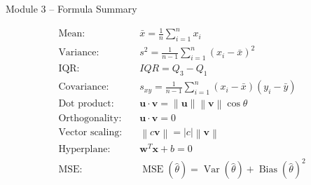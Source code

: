 \documentclass[aspectratio=169,11pt]{beamer}
\newcommand{\Var}{\operatorname{Var}}
\newcommand{\Bias}{\operatorname{Bias}}
\newcommand{\MSE}{\operatorname{MSE}}
\newcommand{\norm}[1]{\left\lVert #1\right\rVert}
\begin{document}

\begin{frame}{Module 3 -- Formula Summary}

\small

\begin{align*}
\text{Mean:}\quad&
\bar{x}=\frac1n\sum_{i=1}^{n}x_i
\\[4pt]
\text{Variance:}\quad&
s^2=\frac1{n-1}\sum_{i=1}^{n}(x_i-\bar{x})^2
\\[4pt]
\text{IQR:}\quad&
IQR=Q_3-Q_1
\\[4pt]
\text{Covariance:}\quad&
s_{xy}=
\frac1{n-1}\sum_{i=1}^{n}
(x_i-\bar{x})(y_i-\bar{y})
\\[4pt]
\text{Dot product:}\quad&
\mathbf u\cdot\mathbf v
=
\norm{\mathbf u}\norm{\mathbf v}\cos\theta
\\[4pt]
\text{Orthogonality:}\quad&
\mathbf u\cdot\mathbf v=0
\\[4pt]
\text{Vector scaling:}\quad&
\norm{c\mathbf v}=|c|\norm{\mathbf v}
\\[4pt]
\text{Hyperplane:}\quad&
\mathbf w^T\mathbf x+b=0
\\[4pt]
\text{MSE:}\quad&
\MSE(\hat\theta)
=
\Var(\hat\theta)+\Bias(\hat\theta)^2
\end{align*}

\end{frame}
\end{document}
